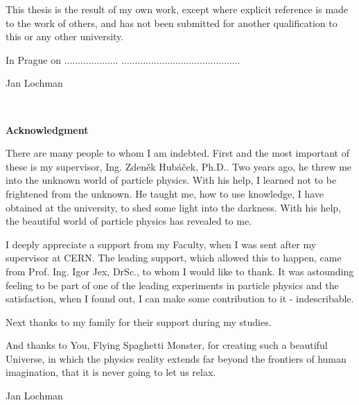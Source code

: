 \documentclass[a4paper,11pt,twoside,openright]{book}
\newcommand{\autor}{Jan Lochman}
\begin{document}
\vspace{0.5cm} 
This thesis is the result of my own work, except where explicit reference
is made to the work of others, and has not been submitted for another
qualification to this or any other university.

\vspace{5mm}In Prague on ....................\hfill 
............................................       
\begin{flushright}
  \autor 
\end{flushright}

\newpage 
\thispagestyle{empty}  
~
   
\newpage 
\thispagestyle{empty}  
{\bf Acknowledgment} 

\vspace{0.5cm} 
There are many people to whom I am indebted. First and the most important of
these is my supervisor, Ing. Zden\v{e}k Hub\'{a}\v{c}ek, Ph.D.. Two years ago,
he threw me into the unknown world of particle physics. With his help, I learned
not to be frightened from the unknown. He taught me, how to use knowledge, I have
obtained at the university, to shed some light into the darkness. With his help,
the beautiful world of particle physics has revealed to me.

I deeply appreciate a support from my Faculty, when I was sent after my
supervisor at CERN. The leading support, which allowed this to happen, came from
Prof. Ing. Igor Jex, DrSc., to whom I would like to thank. It was astounding
feeling to be part of one of the leading experiments in particle physics and the
satisfaction, when I found out, I can make some contribution to it -
indescribable. 

Next thanks to my family for their support during my studies.

And thanks to You, Flying Spaghetti Monster, for creating such a beautiful
Universe, in which the physics reality extends far beyond the frontiers of human
imagination, that it is never going to let us relax.



\begin{flushright}
  \autor 
\end{flushright}
~
\vfill 

\newpage 
\thispagestyle{empty}  
~
\end{document}

